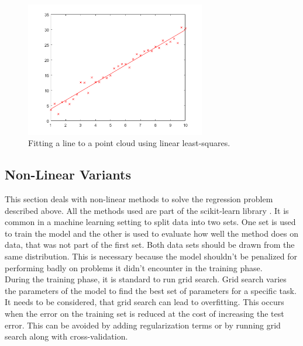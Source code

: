 \begin{figure}[h]
\centering
\includegraphics[width=0.7\textwidth]{figures/linReg}
\caption{Fitting a line to a point cloud using linear least-squares.}
\label{fig:linReg}
\end{figure}

\subsection{Non-Linear Variants}
\label{sec:nonLin}
This section deals with non-linear methods to solve the regression problem described above. All the methods used are part of the scikit-learn library \cite{scikit-learn}. It is common in a machine learning setting to split data into two sets. One set is used to train the model and the other is used to evaluate how well the method does on data, that was not part of the first set. Both data sets should be drawn from the same distribution. This is necessary because the model shouldn't be penalized for performing badly on problems it didn't encounter in the training phase.\\
During the training phase, it is standard to run grid search. Grid search varies the parameters of the model to find the best set of parameters for a specific task. It needs to be considered, that grid search can lead to overfitting. This occurs when the error on the training set is reduced at the cost of increasing the test error. This can be avoided by adding regularization terms or by running grid search along with cross-validation.
